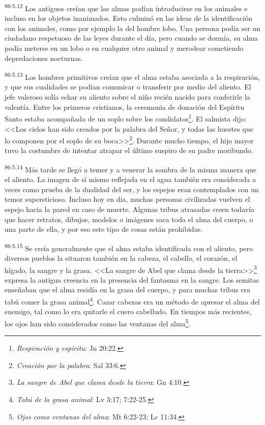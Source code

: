 \documentclass[twoside, 11pt]{book}
\begin{document}
\par
\textsuperscript{86:5.12} Los antiguos creían que las almas podían introducirse en los animales e incluso en los objetos inanimados. Esto culminó en las ideas de la identificación con los animales, como por ejemplo la del hombre lobo. Una persona podía ser un ciudadano respetuoso de las leyes durante el día, pero cuando se dormía, su alma podía meterse en un lobo o en cualquier otro animal y merodear cometiendo depredaciones nocturnas.

\par
\textsuperscript{86:5.13} Los hombres primitivos creían que el alma estaba asociada a la respiración, y que sus cualidades se podían comunicar o transferir por medio del aliento. El jefe valeroso solía echar su aliento sobre el niño recién nacido para conferirle la valentía. Entre los primeros cristianos, la ceremonia de donación del Espíritu Santo estaba acompañada de un soplo sobre los candidatos\footnote{\textit{Respiración y espíritu}: Jn 20:22.}. El salmista dijo: <<Los cielos han sido creados por la palabra del Señor, y todas las huestes que lo componen por el soplo de su boca>>\footnote{\textit{Creación por la palabra}: Sal 33:6.}. Durante mucho tiempo, el hijo mayor tuvo la costumbre de intentar atrapar el último suspiro de su padre moribundo.

\par
\textsuperscript{86:5.14} Más tarde se llegó a temer y a venerar la sombra de la misma manera que el aliento. La imagen de sí mismo reflejada en el agua también era considerada a veces como prueba de la dualidad del ser, y los espejos eran contemplados con un temor supersticioso. Incluso hoy en día, muchas personas civilizadas vuelven el espejo hacia la pared en caso de muerte. Algunas tribus atrasadas creen todavía que hacer retratos, dibujos, modelos o imágenes saca toda el alma del cuerpo, o una parte de ella, y por eso este tipo de cosas están prohibidas.

\par
\textsuperscript{86:5.15} Se creía generalmente que el alma estaba identificada con el aliento, pero diversos pueblos la situaron también en la cabeza, el cabello, el corazón, el hígado, la sangre y la grasa. <<La sangre de Abel que clama desde la tierra>>\footnote{\textit{La sangre de Abel que clama desde la tierra}: Gn 4:10.} expresa la antigua creencia en la presencia del fantasma en la sangre. Los semitas enseñaban que el alma residía en la grasa del cuerpo, y para muchas tribus era tabú comer la grasa animal\footnote{\textit{Tabú de la grasa animal}: Lv 3:17; 7:22-25.}. Cazar cabezas era un método de apresar el alma del enemigo, tal como lo era quitarle el cuero cabelludo. En tiempos más recientes, los ojos han sido considerados como las ventanas del alma\footnote{\textit{Ojos como ventanas del alma}: Mt 6:22-23; Lc 11:34.}.
\end{document}
